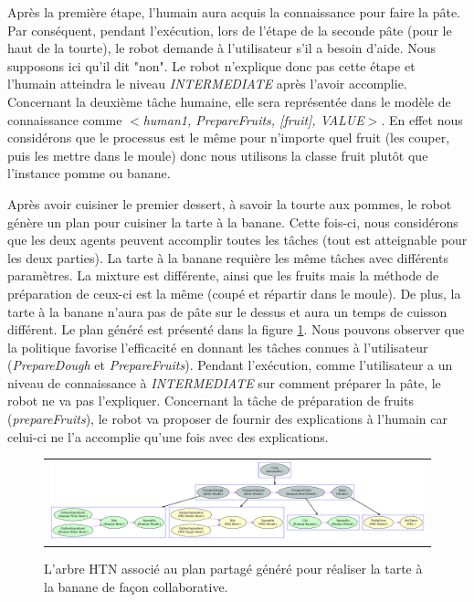 \documentclass[a4paper,11pt,twoside]{StyleThese}
\begin{document}
Après la première étape, l'humain aura acquis la connaissance pour faire la pâte. Par conséquent, pendant l'exécution, lors de l'étape de la seconde pâte (pour le haut de la tourte), le robot demande à l'utilisateur s'il a besoin d'aide. Nous supposons ici qu'il dit "non". Le robot n'explique donc pas cette étape et l'humain atteindra le niveau \textit{INTERMEDIATE} après l'avoir accomplie. Concernant la deuxième tâche humaine, elle sera représentée dans le modèle de connaissance comme \textit{$<$human1, PrepareFruits, [fruit], VALUE$>$}. En effet nous considérons que le processus est le même pour n'importe quel fruit (les couper, puis les mettre dans le moule) donc nous utilisons la classe fruit plutôt que l'instance pomme ou banane.
%
%

Après avoir cuisiner le premier dessert, à savoir la tourte aux pommes, le robot génère un plan pour cuisiner la tarte à la banane. Cette fois-ci, nous considérons que les deux agents peuvent accomplir toutes les tâches (tout est atteignable pour les deux parties). La tarte à la banane requière les même tâches avec différents paramètres. La mixture est différente, ainsi que les fruits mais la méthode de préparation de ceux-ci est la même (coupé et répartir dans le moule). De plus, la tarte à la banane n'aura pas de pâte sur le dessus et aura un temps de cuisson différent. Le plan généré est présenté dans la figure \ref{fig:bananaPlan}. Nous pouvons observer que la politique favorise l'efficacité en donnant les tâches connues à l'utilisateur (\textit{PrepareDough} et \textit{PrepareFruits}). Pendant l'exécution, comme l'utilisateur a un niveau de connaissance à \textit{INTERMEDIATE} sur comment préparer la pâte, le robot ne va pas l'expliquer. Concernant la tâche de préparation de fruits (\textit{prepareFruits}), le robot va proposer de fournir des explications à l'humain car celui-ci ne l'a accomplie qu'une fois avec des explications.


\clearpage

\begin{figure}
 \centering
 \begin{tabular}{c}
  \includegraphics[width=1.0\textwidth]{img/bananaPie.pdf}
 \end{tabular}
 \caption{L'arbre HTN associé au plan partagé généré pour réaliser la tarte à la banane de façon collaborative.}
 \label{fig:bananaPlan}
\end{figure}
\end{document}
